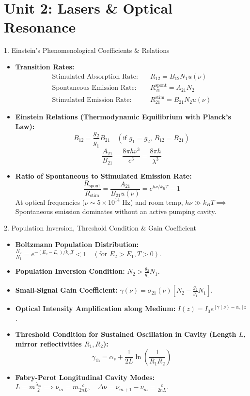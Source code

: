 \chapter{Unit 2: Lasers \& Optical Resonance}

\begin{formulabox}{1. Einstein's Phenomenological Coefficients \& Relations}
\begin{itemize}[leftmargin=*,itemsep=2pt]
    \item \textbf{Transition Rates:}
    \begin{align*}
    \text{Stimulated Absorption Rate:} \quad & R_{12} = B_{12} N_1 u(\nu) \\
    \text{Spontaneous Emission Rate:} \quad & R_{21}^{\text{spont}} = A_{21} N_2 \\
    \text{Stimulated Emission Rate:} \quad & R_{21}^{\text{stim}} = B_{21} N_2 u(\nu)
    \end{align*}
    \item \textbf{Einstein Relations (Thermodynamic Equilibrium with Planck's Law):}
    \[
    B_{12} = \frac{g_2}{g_1} B_{21} \quad (\text{if } g_1 = g_2, \, B_{12} = B_{21})
    \]
    \[
    \frac{A_{21}}{B_{21}} = \frac{8\pi h \nu^3}{c^3} = \frac{8\pi h}{\lambda^3}
    \]
    \item \textbf{Ratio of Spontaneous to Stimulated Emission Rate:}
    \[
    \frac{R_{\text{spont}}}{R_{\text{stim}}} = \frac{A_{21}}{B_{21} u(\nu)} = e^{h\nu / k_B T} - 1
    \]
    At optical frequencies ($\nu \sim 5 \times 10^{14}\text{ Hz}$) and room temp, $h\nu \gg k_B T \implies$ Spontaneous emission dominates without an active pumping cavity.
\end{itemize}
\end{formulabox}

\begin{formulabox}{2. Population Inversion, Threshold Condition \& Gain Coefficient}
\begin{itemize}[leftmargin=*,itemsep=2pt]
    \item \textbf{Boltzmann Population Distribution:} $\frac{N_2}{N_1} = e^{-(E_2 - E_1)/k_B T} < 1 \quad (\text{for } E_2 > E_1, T > 0)$.
    \item \textbf{Population Inversion Condition:} $N_2 > \frac{g_2}{g_1} N_1$.
    \item \textbf{Small-Signal Gain Coefficient:} $\gamma(\nu) = \sigma_{21}(\nu) \left[ N_2 - \frac{g_2}{g_1} N_1 \right]$.
    \item \textbf{Optical Intensity Amplification along Medium:} $I(z) = I_0 e^{[\gamma(\nu) - \alpha_s] z}$.
    \item \textbf{Threshold Condition for Sustained Oscillation in Cavity (Length $L$, mirror reflectivities $R_1, R_2$):}
    \[
    \gamma_{\text{th}} = \alpha_s + \frac{1}{2L}\ln\left(\frac{1}{R_1 R_2}\right)
    \]
    \item \textbf{Fabry-Perot Longitudinal Cavity Modes:} $L = m\frac{\lambda_m}{2} \implies \nu_m = m\frac{c}{2n L}, \quad \Delta\nu = \nu_{m+1} - \nu_m = \frac{c}{2n L}$.
\end{itemize}
\end{formulabox}

